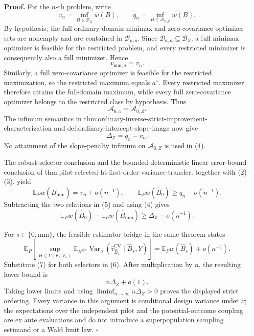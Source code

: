 \textbf{Proof.}
For the \(n\)-th problem, write
\[
v_n=\inf_{B\in\mathcal B_Z}w(B),
\qquad
q_n=\inf_{B\in\mathcal A_{0,Z}}w(B).
\tag{1}
\]
By hypothesis, the full ordinary-domain minimax and zero-covariance optimizer sets are nonempty and are contained in \(\mathcal B_{\kappa,\overline a}\).  Since \(\mathcal B_{\kappa,\overline a}\subseteq\mathcal B_Z\), a full minimax optimizer is feasible for the restricted problem, and every restricted minimizer is consequently also a full minimizer.  Hence
\[
v_{\mathrm{mm},\overline a}=v_n.
\tag{2}
\]
Similarly, a full zero-covariance optimizer is feasible for the restricted maximization, so the restricted maximum equals \(a^\star\).  Every restricted maximizer therefore attains the full-domain maximum, while every full zero-covariance optimizer belongs to the restricted class by hypothesis.  Thus
\[
\mathcal A_{0,\overline a}=\mathcal A_{0,Z}.
\tag{3}
\]
The infimum semantics in thm:ordinary-inverse-strict-improvement-characterization and def:ordinary-intercept-slope-image now give
\[
\Delta_Z=q_n-v_n.
\tag{4}
\]
No attainment of the slope-penalty infimum on \(\mathcal A_{0,Z}\) is used in (4).

The robust-selector conclusion and the bounded deterministic linear error-bound conclusion of thm:pilot-selected-ht-first-order-variance-transfer, together with (2)--(3), yield
\[
\mathbb E_Pw(\widehat B_{\mathrm{mm}})=v_n+o(n^{-1}),
\qquad
\mathbb E_Pw(\widehat B_0)\ge q_n-o(n^{-1}).
\tag{5}
\]
Subtracting the two relations in (5) and using (4) gives
\[
\mathbb E_Pw(\widehat B_0)
-\mathbb E_Pw(\widehat B_{\mathrm{mm}})
\ge\Delta_Z-o(n^{-1}).
\tag{6}
\]

For \(s\in\{0,\mathrm{mm}\}\), the feasible-estimator bridge in the same theorem states
\[
\mathbb E_P\!\left[
\sup_{H\in\Gamma(F_1,F_0)}
\mathbb E_{H^{\otimes n}}
\operatorname{Var}_\nu
\!\left(\widehat\tau_{\widehat B_s}^{\mathrm{CV}}
\mid\widehat B_s,Y\right)
\right]
=\mathbb E_Pw(\widehat B_s)+o(n^{-1}).
\tag{7}
\]
Substitute (7) for both selectors in (6).  After multiplication by \(n\), the resulting lower bound is
\[
n\Delta_Z+o(1).
\]
Taking lower limits and using \(\liminf_{n\to\infty}n\Delta_Z>0\) proves the displayed strict ordering.  Every variance in this argument is conditional design variance under \(\nu\); the expectations over the independent pilot and the potential-outcome coupling are ex ante evaluations and do not introduce a superpopulation sampling estimand or a Wald limit law. \(\square\)